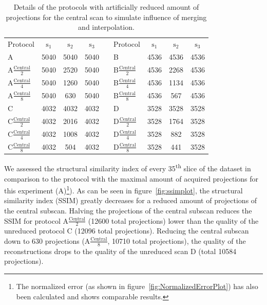 \begin{table}
	\centering
	\caption{Details of the protocols with artificially reduced amount of projections for the central scan to simulate influence of merging and interpolation.}
	\begin{tabular}{lcccclccc}
		Protocol & $\textrm{s}_{1}$ & $\textrm{s}_{2}$ & $\textrm{s}_{3}$ &  &  Protocol & $\textrm{s}_{1}$ & $\textrm{s}_{2}$ & $\textrm{s}_{3}$ \\
		A & 5040 & 5040 & 5040 &  &  B & 4536 & 4536 & 4536 \\
		A$\frac{\textrm{Central}}{2}$ & 5040 & 2520 & 5040 &  & B$\frac{\textrm{Central}}{2}$ & 4536 & 2268 & 4536 \\
		A$\frac{\textrm{Central}}{4}$ & 5040 & 1260 & 5040 &  & B$\frac{\textrm{Central}}{4}$ & 4536 & 1134 & 4536 \\
		A$\frac{\textrm{Central}}{8}$ & 5040 & 630 & 5040 &  & B$\frac{\textrm{Central}}{8}$ & 4536 & 567 & 4536 \\
		\hline
		C & 4032 & 4032 & 4032 &  &  D & 3528 & 3528 & 3528 \\
		C$\frac{\textrm{Central}}{2}$ & 4032 & 2016 & 4032 &  & D$\frac{\textrm{Central}}{2}$ & 3528 & 1764 & 3528 \\
		C$\frac{\textrm{Central}}{4}$ & 4032 & 1008 & 4032 &  & D$\frac{\textrm{Central}}{4}$ & 3528 & 882 & 3528 \\
		C$\frac{\textrm{Central}}{8}$ & 4032 & 504 & 4032 &  & D$\frac{\textrm{Central}}{8}$ & 3528 & 441 & 3528 \\
	\end{tabular}  
	\label{tab:abcd}
\end{table}

We assessed the structural similarity index \cite{Wang2004} of every 35\textsuperscript{th} slice of the dataset in comparison to the protocol with the maximal amount of acquired projections for this experiment (A)\footnote{The normalized error (as shown in figure~\ref{fig:NormalizedErrorPlot}) has also been calculated and shows comparable results.}). As can be seen in figure~\ref{fig:ssimplot}, the structural similarity index (SSIM) greatly decreases for a reduced amount of projections of the central subscan. Halving the projections of the central subscan reduces the SSIM for protocol A$\frac{\textrm{Central}}{2}$ (12600 total projections) lower than the quality of the unreduced protocol C (12096 total projections). Reducing the central subscan down to 630 projections (A$\frac{\textrm{Central}}{8}$, 10710 total projections), the quality of the reconstructions drops to the quality of the unreduced scan D (total 10584 projections). 

